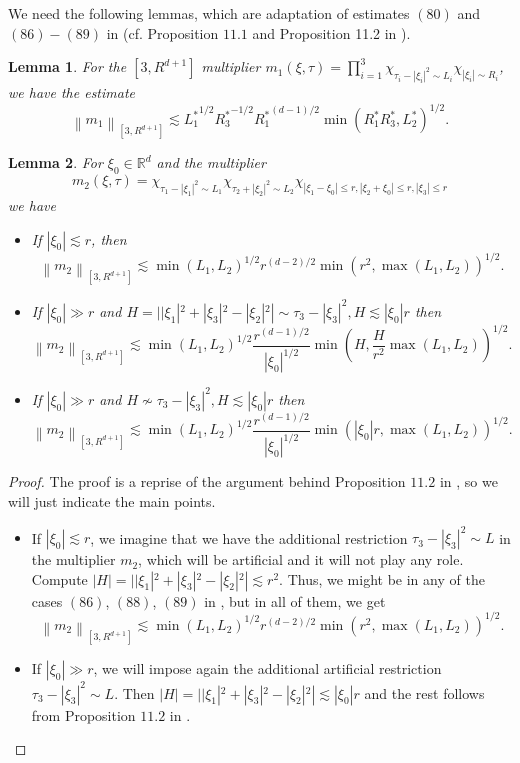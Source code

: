 \documentclass[draft,11pt,leqno]{amsart}
\newtheorem{lemma}{Lemma}
\newcommand{\norm}[2]{{\left\| #1 \right\|}_{#2}}
\newcommand{\f}{\displaystyle\frac}
\newcommand{\lone}{{L_1^{*}}}
\newcommand{\ltwo}{{L_2^{*}}}
\begin{document}
We need the following lemmas, which are adaptation of estimates  
$(80)$ and $(86)-(89)$ in \cite{Tao} 
(cf. Proposition $11.1$ and Proposition 11.2 in \cite{Tao}).
\begin{lemma}
\label{le:5}
For the $[3,R^{d+1}]$ multiplier
$m_1(\xi,\tau)=
\prod_{i=1}^3\chi_{ \tau_i-|\xi_i|^2\sim L_i}
\chi_{|\xi_i|\sim R_i}$, we have the estimate 
$$
\norm{m_1}{[3,R^{d+1}]}\lesssim \lone^{1/2}{R_3^*}^{-1/2}
{R_1^*}^{(d-1)/2}\min(R_1^* R_3^*,\ltwo)^{1/2}. 
$$
\end{lemma}
\begin{lemma}
\label{le:11}
For $\xi_0\in {\mathbb R^d}$ and the multiplier 
$$
m_2(\xi,\tau)=
\chi_{ \tau_1-|\xi_1|^2\sim L_1}\chi_{ \tau_2+|\xi_2|^2\sim L_2}
\chi_{|\xi_1-\xi_0|\leq r,|\xi_2+\xi_0|\leq r,|\xi_3|\leq r }
$$
we have
\begin{itemize}
\item If $|\xi_0|\lesssim r$, then 
\begin{equation}
\label{eq:523}
\norm{m_2}{[3,R^{d+1}]}\lesssim \min(L_1,L_2)^{1/2}r^{(d-2)/2}\min(r^2, \max(L_1,L_2))^{1/2}.
\end{equation}
\item If $|\xi_0|\gg r$ and $H=||\xi_1|^2+|\xi_3|^2-|\xi_2|^2|\sim \tau_3-|\xi_3|^2, H\lesssim |\xi_0|r$ then
\begin{equation}
\label{eq:524}
\norm{m_2}{[3,R^{d+1}]}\lesssim \min(L_1,L_2)^{1/2}\f{r^{(d-1)/2}}{|\xi_0|^{1/2}}\min\left(H, \f{H}{r^2} \max(L_1,L_2)\right)^{1/2}.
\end{equation}

\item If $|\xi_0|\gg r$ and $H\nsim \tau_3-|\xi_3|^2, H\lesssim |\xi_0|r$  then
\begin{equation}
\label{eq:525}
\norm{m_2}{[3,R^{d+1}]}\lesssim \min(L_1,L_2)^{1/2}\f{r^{(d-1)/2}}{|\xi_0|^{1/2}}\min(|\xi_0|r, \max(L_1,L_2))^{1/2}.
\end{equation}
\end{itemize}
\end{lemma}
\begin{proof}
The proof is a reprise of the argument behind Proposition $11.2$ in 
\cite{Tao}, so we will just indicate the main points.
\begin{itemize}
\item If $|\xi_0|\lesssim r$, we imagine that we
 have the additional restriction $\tau_3-|\xi_3|^2\sim L$ in 
the multiplier $m_2$, which will be artificial and it 
will not play any role. Compute $|H|=||\xi_1|^2+
|\xi_3|^2-|\xi_2|^2|\lesssim r^2$. Thus, we might be in any
of the cases $(86)$, $(88)$, $(89)$ in \cite{Tao}, but 
in all of them, we get
$$
\norm{m_2}{[3,R^{d+1}]}\lesssim \min(L_1,L_2)^{1/2}r^{(d-2)/2}
\min(r^2, \max(L_1,L_2))^{1/2}.
$$
\item If $|\xi_0|\gg r$, we will impose again the additional artificial restriction $\tau_3-|\xi_3|^2\sim L$. Then 
$|H|=||\xi_1|^2+|\xi_3|^2-|\xi_2|^2|\lesssim |\xi_0|r$ and the rest follows from Proposition $11.2$ in \cite{Tao}.
\end{itemize}
\end{proof}
\end{document}
